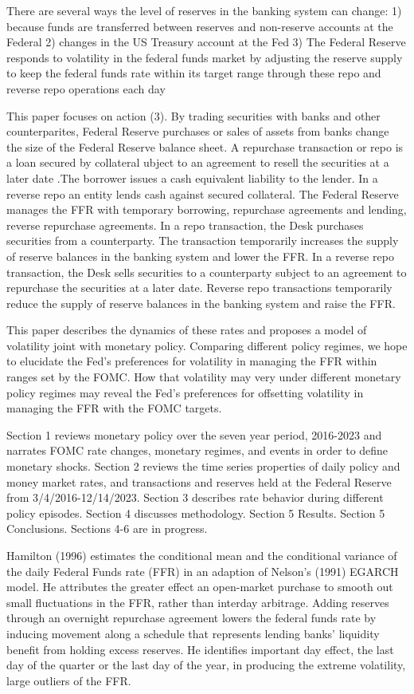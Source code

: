 \documentclass[
]{article}
\begin{document}
There are several ways the level of reserves in the banking system can change:
1) because funds are transferred between reserves and non-reserve accounts at the Federal
2) changes in the US Treasury account at the Fed
3) The Federal Reserve responds to volatility in the federal funds market by adjusting the reserve
supply to keep the federal funds rate within its target range through these repo and reverse repo operations each day

This paper focuses on action (3). By trading securities with banks and other counterparites, Federal Reserve purchases or sales of assets from banks change the size of the Federal Reserve balance sheet. A repurchase transaction or repo is a loan secured by collateral ubject to an agreement to resell the securities at a later date .The borrower issues a cash equivalent liability to the lender. In a reverse repo an entity lends cash against secured collateral. The Federal Reserve manages the FFR with temporary borrowing, repurchase agreements and lending, reverse repurchase agreements. In a repo transaction, the Desk purchases securities from a counterparty. The transaction temporarily increases the supply of reserve balances in the banking system and lower the FFR. In a reverse repo transaction, the Desk sells securities to a counterparty subject to an agreement to repurchase the securities at a later date. Reverse repo transactions temporarily reduce the supply of reserve balances in the banking system and raise the FFR.

This paper describes the dynamics of these rates and proposes a model of volatility joint with monetary policy. Comparing different policy regimes, we hope to elucidate the Fed's preferences for volatility in managing the FFR within ranges set by the FOMC. How that volatility may very under different monetary policy regimes may reveal the Fed's preferences for offsetting volatility in managing the FFR with the FOMC targets.

Section 1 reviews monetary policy over the seven year period, 2016-2023 and narrates FOMC rate changes, monetary regimes, and events in order to define monetary shocks.
Section 2 reviews the time series properties of daily policy and money market rates, and transactions and reserves held at the Federal Reserve from 3/4/2016-12/14/2023. Section 3 describes rate behavior during different policy episodes. Section 4 discusses methodology. Section 5 Results. Section 5 Conclusions. Sections 4-6 are in progress.

Hamilton (1996) estimates the conditional mean and the conditional variance of the daily Federal Funds rate (FFR) in an adaption of Nelson's (1991) EGARCH model. He attributes the greater effect an open-market purchase to smooth out small fluctuations in the FFR, rather than interday arbitrage. Adding reserves through an overnight repurchase agreement lowers the federal funds rate by inducing movement along a schedule that represents lending banks' liquidity benefit from holding excess reserves. He identifies important day effect, the last day of the quarter or the last day of the year, in producing the extreme volatility, large outliers of the FFR.
\end{document}
